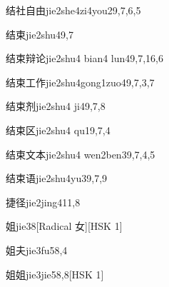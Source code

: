 \begin{entry}{结社自由}{jie2she4zi4you2}{9,7,6,5}
\end{entry}

\begin{entry}{结束}{jie2shu4}{9,7}
\end{entry}

\begin{entry}{结束辩论}{jie2shu4 bian4 lun4}{9,7,16,6}
\end{entry}

\begin{entry}{结束工作}{jie2shu4gong1zuo4}{9,7,3,7}
\end{entry}

\begin{entry}{结束剂}{jie2shu4 ji4}{9,7,8}
\end{entry}

\begin{entry}{结束区}{jie2shu4 qu1}{9,7,4}
\end{entry}

\begin{entry}{结束文本}{jie2shu4 wen2ben3}{9,7,4,5}
\end{entry}

\begin{entry}{结束语}{jie2shu4yu3}{9,7,9}
\end{entry}

\begin{entry}{捷径}{jie2jing4}{11,8}
\end{entry}

\begin{entry}{姐}{jie3}{8}[Radical 女][HSK 1]
\end{entry}

\begin{entry}{姐夫}{jie3fu5}{8,4}
\end{entry}

\begin{entry}{姐姐}{jie3jie5}{8,8}[HSK 1]
\end{entry}

